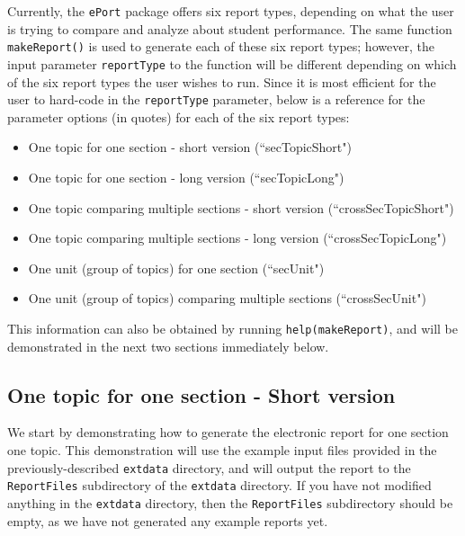 \documentclass{article}\usepackage[]{graphicx}\usepackage[]{color}
\numberwithin{equation}{section} %
\newcommand{\pkg}[1]{{\texttt{#1}}}
\begin{document}
Currently, the \pkg{ePort} package offers six report types, depending on what the user is trying to compare and analyze about student performance. The same function \texttt{makeReport()} is used to generate each of these six report types; however, the input parameter \texttt{reportType} to the function will be different depending on which of the six report types the user wishes to run. Since it is most efficient for the user to hard-code in the \texttt{reportType} parameter, below is a reference for the parameter options (in quotes) for each of the six report types: 
\begin{framed}
\begin{itemize}
\vspace{-3mm}
\item One topic for one section - short version (``secTopicShort")
\item One topic for one section - long version (``secTopicLong")
\item One topic comparing multiple sections - short version (``crossSecTopicShort")
\item One topic comparing multiple sections - long version (``crossSecTopicLong")
\item One unit (group of topics) for one section (``secUnit")
\item One unit (group of topics) comparing multiple sections (``crossSecUnit")
\end{itemize}
\end{framed}
This information can also be obtained by running \texttt{help(makeReport)}, and will be demonstrated in the next two sections immediately below.

\subsection{One topic for one section - Short version}

We start by demonstrating how to generate the electronic report for one section one topic. This demonstration will use the example input files provided in the previously-described \texttt{extdata} directory, and will output the report to the \texttt{ReportFiles} subdirectory of the \texttt{extdata} directory. If you have not modified anything in the \texttt{extdata} directory, then the \texttt{ReportFiles} subdirectory should be empty, as we have not generated any example reports yet.
\end{document}
